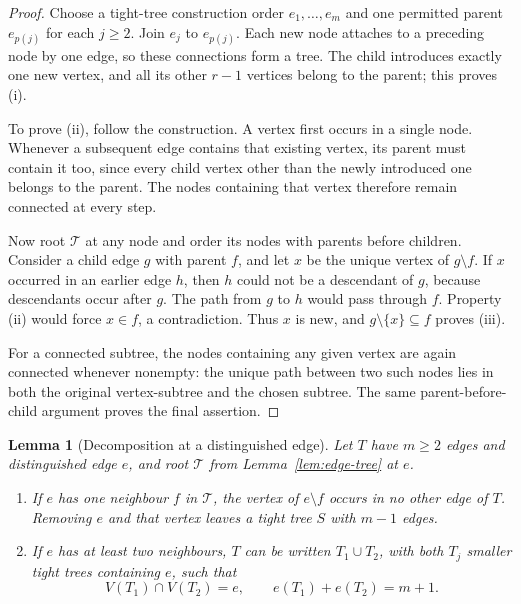 \documentclass[11pt]{article}
\numberwithin{equation}{section}
\newtheorem{lemma}[theorem]{Lemma}
\theoremstyle{definition}
\begin{document}
\begin{proof}
Choose a tight-tree construction order $e_1,\ldots,e_m$ and one
permitted parent $e_{p(j)}$ for each $j\geq2$.  Join $e_j$ to
$e_{p(j)}$.  Each new node attaches to a preceding node by one edge,
so these connections form a tree.  The child introduces exactly one
new vertex, and all its other $r-1$ vertices belong to the parent;
this proves (i).

To prove (ii), follow the construction.  A vertex first occurs in a
single node.  Whenever a subsequent edge contains that existing vertex,
its parent must contain it too, since every child vertex other than the
newly introduced one belongs to the parent.  The nodes containing that
vertex therefore remain connected at every step.

Now root $\mathscr T$ at any node and order its nodes with parents
before children.  Consider a child edge $g$ with parent $f$, and let
$x$ be the unique vertex of $g\setminus f$.  If $x$ occurred in an
earlier edge $h$, then $h$ could not be a descendant of $g$, because
descendants occur after $g$.  The path from $g$ to $h$ would pass
through $f$.  Property (ii) would force $x\in f$, a contradiction.
Thus $x$ is new, and $g\setminus\{x\}\subseteq f$ proves (iii).

For a connected subtree, the nodes containing any given vertex are
again connected whenever nonempty: the unique path between two such
nodes lies in both the original vertex-subtree and the chosen subtree.
The same parent-before-child argument proves the final assertion.
\end{proof}

\begin{lemma}[Decomposition at a distinguished edge]
\label{lem:edge-decomposition}
Let $T$ have $m\geq2$ edges and distinguished edge $e$, and root
$\mathscr T$ from Lemma~\ref{lem:edge-tree} at $e$.
\begin{enumerate}[label=\textup{(\roman*)},leftmargin=*]
\item If $e$ has one neighbour $f$ in $\mathscr T$, the vertex of
      $e\setminus f$ occurs in no other edge of $T$.  Removing $e$
      and that vertex leaves a tight tree $S$ with $m-1$ edges.
\item If $e$ has at least two neighbours, $T$ can be written
      $T_1\cup T_2$, with both $T_j$ smaller tight trees containing
      $e$, such that
      \[
       V(T_1)\cap V(T_2)=e,\qquad e(T_1)+e(T_2)=m+1.
      \]
\end{enumerate}
\end{lemma}
\end{document}
